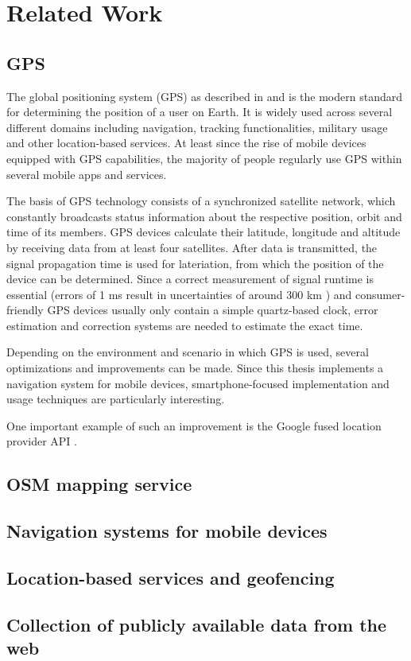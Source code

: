 \chapter{Related Work}
\label{cha:relatedwork}

\section{GPS}
The global positioning system (GPS) as described in \cite{272176} and \cite{1013999415003} is the modern standard for determining the position of a user on Earth. It is widely used across several different domains including navigation, tracking functionalities, military usage and other location-based services. At least since the rise of mobile devices equipped with GPS capabilities, the majority of people regularly use GPS within several mobile apps and services.

The basis of GPS technology consists of a synchronized satellite network, which constantly broadcasts status information about the respective position, orbit and time of its members. GPS devices calculate their latitude, longitude and altitude by receiving data from at least four satellites. After data is transmitted, the signal propagation time is used for lateriation, from which the position of the device can be determined. Since a correct measurement of signal runtime is essential (errors of 1 ms result in uncertainties of around 300 km \cite{1013999415003}) and consumer-friendly GPS devices usually only contain a simple quartz-based clock, error estimation and correction systems are needed to estimate the exact time.

Depending on the environment and scenario in which GPS is used, several optimizations and improvements can be made. Since this thesis implements a navigation system for mobile devices, smartphone-focused implementation and usage techniques are particularly interesting.

One important example of such an improvement is the Google fused location provider API \cite{fused_location_api}. 

\section{OSM mapping service}

\section{Navigation systems for mobile devices}

\section{Location-based services and geofencing}

\section{Collection of publicly available data from the web}
